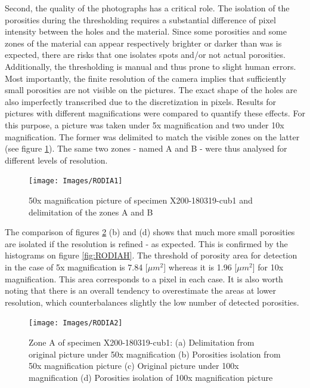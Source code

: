Second, the quality of the photographs has a critical role. The isolation of the porosities during the thresholding requires a substantial difference of pixel intensity between the holes and the material. Since some porosities and some zones of the material can appear respectively brighter or darker than was is expected, there are risks that one isolates spots and/or not actual porosities. Additionally, the thresholding is manual and thus prone to slight human errors. \\

Most importantly, the finite resolution of the camera implies that sufficiently small porosities are not visible on the pictures. The exact shape of the holes are also imperfectly transcribed due to the discretization in pixels. Results for pictures with different magnifications were compared to quantify these effects. For this purpose, a picture was taken under 5x magnification and two under 10x magnification. The former was delimited to match the visible zones on the latter (see figure \ref{fig:RODIA1}). The same two zones - named A and B - were thus analysed for different levels of resolution.\\

\begin{figure}[ht]
\centering
\centerline{\texttt{[image: Images/RODIA1]}}
\decoRule
\caption[50x magnification picture of specimen X200-180319-cub1 and delimitation of the zones A and B]{50x magnification picture of specimen X200-180319-cub1 and delimitation of the zones A and B}
\label{fig:RODIA1}
\end{figure}

The comparison of figures \ref{fig:RODIA2} (b) and (d) shows that much more small porosities are isolated if the resolution is refined - as expected. This is confirmed by the histograms on figure \ref{fig:RODIAH}. The threshold of porosity area for detection in the case of 5x magnification is 7.84 [$\mu m^2$] whereas it is 1.96 [$\mu m^2$] for 10x magnification. This area corresponds to a pixel in each case. It is also worth noting that there is an overall tendency to overestimate the areas at lower resolution, which counterbalances slightly the low number of detected porosities. \\

\begin{figure}[ht]
\centering
\centerline{\texttt{[image: Images/RODIA2]}}
\decoRule
\caption[Zone A of specimen X200-180319-cub1: (a) Delimitation from original picture under 50x magnification (b) Porosities isolation from 50x magnification picture (c) Original picture under 100x magnification (d) Porosities isolation of 100x magnification picture]{Zone A of specimen X200-180319-cub1: (a) Delimitation from original picture under 50x magnification (b) Porosities isolation from 50x magnification picture (c) Original picture under 100x magnification (d) Porosities isolation of 100x magnification picture}
\label{fig:RODIA2}
\end{figure}

